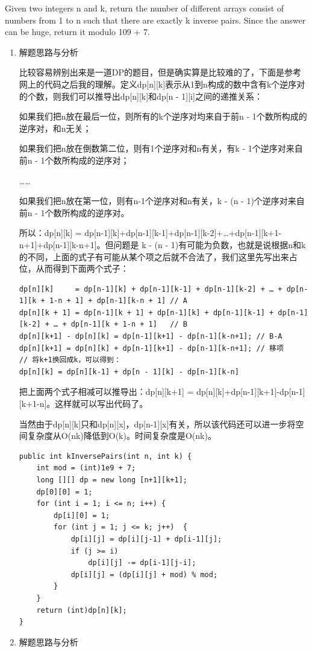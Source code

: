 \documentclass[9pt, b5paaper]{book}
\begin{document}
Given two integers n and k, return the number of different arrays consist of numbers from 1 to n such that there are exactly k inverse pairs. Since the answer can be huge, return it modulo 109 + 7.
\begin{enumerate}
\item 解题思路与分析
\label{sec-1-4-61-0-1}

比较容易辨别出来是一道DP的题目，但是确实算是比较难的了，下面是参考网上的代码之后我的理解。定义dp[n][k]表示从1到n构成的数中含有k个逆序对的个数，则我们可以推导出dp[n][k]和dp[n - 1][i]之间的递推关系：

如果我们把n放在最后一位，则所有的k个逆序对均来自于前n - 1个数所构成的逆序对，和n无关；

如果我们把n放在倒数第二位，则有1个逆序对和n有关，有k - 1个逆序对来自前n - 1个数所构成的逆序对；

……

如果我们把n放在第一位，则有n-1个逆序对和n有关，k - (n - 1)个逆序对来自前n - 1个数所构成的逆序对。

所以：dp[n][k] = dp[n-1][k]+dp[n-1][k-1]+dp[n-1][k-2]+…+dp[n-1][k+1-n+1]+dp[n-1][k-n+1]。但问题是 k - (n - 1)有可能为负数，也就是说根据n和k的不同，上面的式子有可能从某个项之后就不合法了，我们这里先写出来占位，从而得到下面两个式子：

\begin{verbatim}
dp[n][k]     = dp[n-1][k] + dp[n-1][k-1] + dp[n-1][k-2] + … + dp[n-1][k + 1-n + 1] + dp[n-1][k-n + 1] // A
dp[n][k + 1] = dp[n-1][k + 1] + dp[n-1][k] + dp[n-1][k-1] + dp[n-1][k-2] + … + dp[n-1][k + 1-n + 1]   // B
dp[n][k+1] - dp[n][k] = dp[n-1][k+1] - dp[n-1][k-n+1]; // B-A           
dp[n][k+1] = dp[n][k] + dp[n-1][k+1] - dp[n-1][k-n+1]; // 移项
// 将k+1换回成k，可以得到：
dp[n][k] = dp[n][k-1] + dp[n - 1][k] - dp[n-1][k-n]
\end{verbatim}

把上面两个式子相减可以推导出：dp[n][k+1] = dp[n][k]+dp[n-1][k+1]-dp[n-1][k+1-n]。这样就可以写出代码了。

当然由于dp[n][k]只和dp[n][x]，dp[n-1][x]有关，所以该代码还可以进一步将空间复杂度从O(nk)降低到O(k)。时间复杂度是O(nk)。

\begin{verbatim}
public int kInversePairs(int n, int k) {
    int mod = (int)1e9 + 7;
    long [][] dp = new long [n+1][k+1];
    dp[0][0] = 1;
    for (int i = 1; i <= n; i++) {
        dp[i][0] = 1;
        for (int j = 1; j <= k; j++)  {
            dp[i][j] = dp[i][j-1] + dp[i-1][j];
            if (j >= i)
                dp[i][j] -= dp[i-1][j-i];
            dp[i][j] = (dp[i][j] + mod) % mod;
        }
    }
    return (int)dp[n][k];
}
\end{verbatim}
\item 解题思路与分析
\label{sec-1-4-61-0-2}


\end{enumerate}
\end{document}
